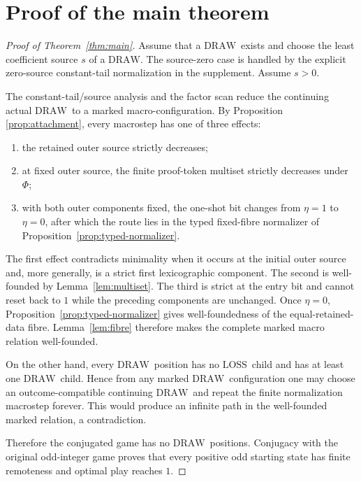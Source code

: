 \documentclass[11pt]{article}
\newcommand{\LOSS}{\ensuremath{\mathrm{LOSS}}}
\newcommand{\DRAW}{\ensuremath{\mathrm{DRAW}}}
\newcommand{\PhiM}{\Phi}
\begin{document}
\section{Proof of the main theorem}

\begin{proof}[Proof of Theorem~\ref{thm:main}]
Assume that a \DRAW\ exists and choose the least coefficient source $s$ of a
\DRAW. The source-zero case is handled by the explicit zero-source
constant-tail normalization in the supplement. Assume $s>0$.

The constant-tail/source analysis and the factor scan reduce the continuing
actual \DRAW\ to a marked macro-configuration. By Proposition
\ref{prop:attachment}, every macrostep has one of three effects:
\begin{enumerate}[label=(\arabic*)]
\item the retained outer source strictly decreases;
\item at fixed outer source, the finite proof-token multiset strictly
      decreases under $\PhiM$;
\item with both outer components fixed, the one-shot bit changes from
      $\eta=1$ to $\eta=0$, after which the route lies in the typed fixed-fibre
      normalizer of Proposition~\ref{prop:typed-normalizer}.
\end{enumerate}
The first effect contradicts minimality when it occurs at the initial outer
source and, more generally, is a strict first lexicographic component. The
second is well-founded by Lemma~\ref{lem:multiset}. The third is strict at the
entry bit and cannot reset back to $1$ while the preceding components are
unchanged. Once $\eta=0$, Proposition~\ref{prop:typed-normalizer} gives
well-foundedness of the equal-retained-data fibre. Lemma~\ref{lem:fibre}
therefore makes the complete marked macro relation well-founded.

On the other hand, every \DRAW\ position has no \LOSS\ child and has at least
one \DRAW\ child. Hence from any marked \DRAW\ configuration one may choose an
outcome-compatible continuing \DRAW\ and repeat the finite normalization
macrostep forever. This would produce an infinite path in the well-founded
marked relation, a contradiction.

Therefore the conjugated game has no \DRAW\ positions. Conjugacy with the
original odd-integer game proves that every positive odd starting state has
finite remoteness and optimal play reaches $1$.
\end{proof}
\end{document}
